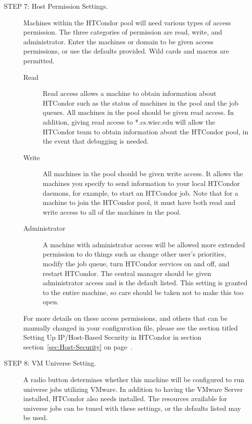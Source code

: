 \begin{description}
\item[STEP 7: Host Permission Settings.]
     Machines within the HTCondor pool will need various types of 
     access permission. 
     The three categories of permission are read, write, and administrator.
     Enter the machines or domain to be given access permissions,
     or use the defaults provided.
     Wild cards and macros are permitted.

     \begin{description}
     \item[Read]
     Read access allows a machine to obtain information about
     HTCondor such as the status of machines in the pool and the job queues.
     All machines in the pool should be given read access. 
     In addition, giving read access to *.cs.wisc.edu 
     will allow the HTCondor team to obtain information about
     the HTCondor pool, in the event that debugging is needed.
     \item[Write]
     All machines in the pool should be given write access. 
     It allows the machines you specify to send information to your
     local HTCondor daemons, for example, to start an HTCondor job.
     Note that for a machine to join the HTCondor pool, 
     it must have both read and write access to all of the machines in the pool.
     \item[Administrator]
     A machine with administrator access will be allowed more
     extended permission to do things such as
     change other user's priorities, modify the job queue,
     turn HTCondor services on and off, and restart HTCondor.
     The central manager should be given administrator access
     and is the default listed.
     This setting is granted to the entire machine, 
     so care should be taken not to make this too open.
     \end{description}

     For more details on these access permissions, and others that can be
     manually changed in your configuration file, please
     see the section titled Setting Up IP/Host-Based Security in HTCondor
     in section section~\ref{sec:Host-Security}
     on page~\pageref{sec:Host-Security}.

\item[STEP 8: VM Universe Setting.]
     A radio button determines whether 
     this machine will be configured to run  universe jobs 
     utilizing VMware.
     In addition to having the VMware Server installed, HTCondor also needs
      installed.
     The resources available for  universe jobs can be tuned 
     with these settings, or the defaults listed may be used.


\end{description}
